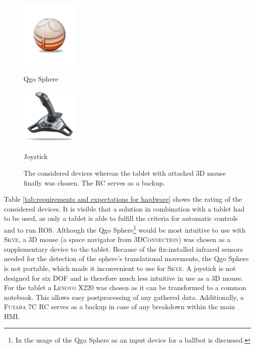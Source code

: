 \begin{figure}[h]
{\begin{center}
			\vspace{0.005\textwidth}
			\hspace{0.05\textwidth}			
			\parbox[b]{0.25\textwidth}{\includegraphics[width=0.25\textwidth]{qgo_sphere_cut}
			\begin{center}Qgo Sphere \end{center}}
			\hspace{0.05\textwidth}
			\parbox[b]{0.25\textwidth}{\includegraphics[width=0.25\textwidth]{Logitech-Freedom-Cordless-Joystick}
			\begin{center}Joystick \end{center}}
			\caption{The considered devices whereas the tablet with attached 3D mouse finally was chosen. The RC serves as a backup.}
			\label{fig:devices taken into consideration}	
		\end{center}
	}			
	\vspace{4.5mm}
\end{figure}

Table \ref{tab:requirements and expectations for hardware} shows the rating of the considered devices. It is visible that a solution in combination with a tablet had to be used, as only a tablet is able to fulfill the criteria for automatic controls and to run \textsc{ROS}. Although the Qgo Sphere\footnote{In  \cite{kammermann} the usage of the Qgo Sphere as an input device for a ballbot is discussed.} would be most intuitive to use with \textsc{Skye}, a 3D mouse (a space navigator from \textsc{3DConnection}) was chosen as a supplementary device to the tablet. Because of the fix-installed infrared sensors needed for the detection of the sphere's translational movements, the Qgo Sphere is not portable, which made it inconvenient to use for \textsc{Skye}. A joystick is not designed for six DOF and is therefore much less intuitive in use as a 3D mouse. For the tablet a \textsc{Lenovo} X220 was chosen as it can be transformed to a common notebook. This allows easy postprocessing of any gathered data. Additionally, a \textsc{Futaba} 7C RC serves as a backup in case of any breakdown within the main HMI.


